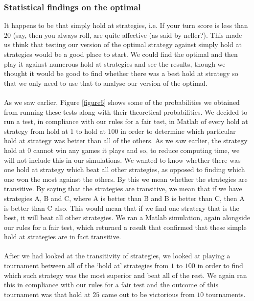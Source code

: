\documentclass[a4paper,titlepage]{article}
\begin{document}
\subsubsection{Statistical findings on the optimal}
It happens to be that simply hold at strategies, i.e. If your turn score is less than $20$ (say, then you always roll, are quite affective (as said by neller?). This made us think that testing our version of the optimal strategy against simply hold at strategies would be a good place to start. We could find the optimal and then play it against numerous hold at strategies and see the results, though we thought it would be good to find whether there was a best hold at strategy so that we only need to use that to analyse our version of the optimal.\\ \\
As we saw earlier, Figure \ref{figure6} shows some of the probabilities we obtained from running these tests along with their theoretical probabilities. We decided to run a test, in compliance with our rules for a fair test, in Matlab of every hold at strategy from hold at $1$ to hold at $100$ in order to determine which particular hold at strategy was better than all of the others. As we saw earlier, the strategy hold at $0$ cannot win any games it plays and so, to reduce computing time, we will not include this in our simulations. We wanted to know whether there was one hold at strategy which beat all other strategies, as opposed to finding which one won the most against the others. By this we mean whether the strategies are transitive. By saying that the strategies are transitive, we mean that if we have strategies A, B and C, where A is better than B and B is better than C, then A is better than C also. This would mean that if we find one strategy that is the best, it will beat all other strategies. We ran a Matlab simulation, again alongside our rules for a fair test, which returned a result that confirmed that these simple hold at strategies are in fact transitive.\\ \\
After we had looked at the transitivity of strategies, we looked at playing a tournament between all of the ‘hold at’ strategies from $1$ to $100$ in order to find which such strategy was the most superior and beat all of the rest. We again ran this in compliance with our rules for a fair test and the outcome of this tournament was that hold at $25$ came out to be victorious from $10$ tournaments.
\end{document}
